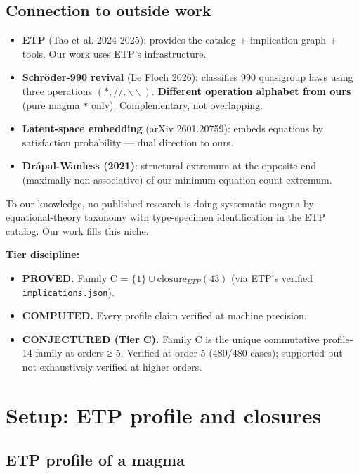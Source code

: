 \documentclass[11pt,reqno]{amsart}
\theoremstyle{plain}
\theoremstyle{definition}
\begin{document}
\subsection{Connection to outside work}

\begin{itemize}
\item \textbf{ETP} (Tao et al. 2024-2025): provides the catalog + implication graph + tools. Our work uses ETP's infrastructure.
\item \textbf{Schröder-990 revival} (Le Floch 2026): classifies 990 quasigroup laws using three operations $(*, //, \backslash\backslash)$. \textbf{Different operation alphabet from ours} (pure magma \texttt{*} only). Complementary, not overlapping.
\item \textbf{Latent-space embedding} (arXiv 2601.20759): embeds equations by satisfaction probability --- dual direction to ours.
\item \textbf{Drápal-Wanless (2021)}: structural extremum at the opposite end (maximally non-associative) of our minimum-equation-count extremum.
\end{itemize}

To our knowledge, no published research is doing systematic magma-by-equational-theory taxonomy with type-specimen identification in the ETP catalog. Our work fills this niche.

\textbf{Tier discipline:}
\begin{itemize}
\item \textbf{PROVED.} Family C = $\{1\} \cup \mathrm{closure}_{ETP}(43)$ (via ETP's verified \texttt{implications.json}).
\item \textbf{COMPUTED.} Every profile claim verified at machine precision.
\item \textbf{CONJECTURED (Tier C).} Family C is the unique commutative profile-14 family at orders ≥ 5. Verified at order 5 (480/480 cases); supported but not exhaustively verified at higher orders.
\end{itemize}

\section{Setup: ETP profile and closures}

\subsection{ETP profile of a magma}
\end{document}
